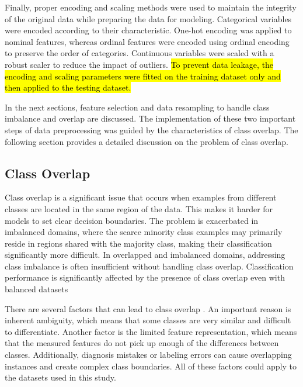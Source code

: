 Finally, proper encoding and scaling methods were used to maintain the integrity of the original data while preparing the data for modeling. Categorical variables were encoded according to their characteristic. One-hot encoding was applied to nominal features, whereas ordinal features were encoded using ordinal encoding to preserve the order of categories. Continuous variables were scaled with a robust scaler to reduce the impact of outliers. \hl{To prevent data leakage, the encoding and scaling parameters were fitted on the training dataset only and then applied to the testing dataset.}

In the next sections, feature selection and data resampling to handle class imbalance and overlap are discussed. The implementation of these two important steps of data preprocessing was guided by the characteristics of class overlap. The following section provides a detailed discussion on the problem of class overlap.

\subsection{Class Overlap} \label{class-overlap-section}
Class overlap is a significant issue that occurs when examples from different classes are located in the same region of the data. This makes it harder for models to set clear decision boundaries. The problem is exacerbated in imbalanced domains, where the scarce minority class examples may primarily reside in regions shared with the majority class, making their classification significantly more difficult. In overlapped and imbalanced domains, addressing class imbalance is often insufficient without handling class overlap. Classification performance is significantly affected by the presence of class overlap even with balanced datasets \cite{Pattaramon2021On}

There are several factors that can lead to class overlap \cite{Santos2022Joint}. An important reason is inherent ambiguity, which means that some classes are very similar and difficult to differentiate. Another factor is the limited feature representation, which means that the measured features do not pick up enough of the differences between classes. Additionally, diagnosis mistakes or labeling errors can cause overlapping instances and create complex class boundaries. All of these factors could apply to the datasets used in this study.

